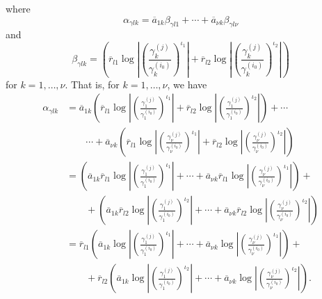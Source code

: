 where
\[\alpha_{\gamma l k} = \overline{a}_{1k}\beta_{\gamma l 1} + \cdots + \overline{a}_{\nu k}\beta_{\gamma l \nu}\]
and
\[\beta_{\gamma l k} = \left(\overline{r}_{l1} \log\left| \left( \frac{\gamma_k^{(j)}}{\gamma_k^{(i_0)}}\right)^{\iota_1}\right|+ \overline{r}_{l2}\log\left| \left( \frac{\gamma_k^{(j)}}{\gamma_k^{(i_0)}}\right)^{\iota_2}\right|\right)\]
for $k = 1, \dots, \nu$.
That is, for $k = 1, \dots, \nu$, we have
\begin{align*}
\alpha_{\gamma l k}	
& = \overline{a}_{1k}\left(\overline{r}_{l1} \log\left| \left( \frac{\gamma_1^{(j)}}{\gamma_1^{(i_0)}}\right)^{\iota_1}\right|+ \overline{r}_{l2}\log\left| \left( \frac{\gamma_1^{(j)}}{\gamma_1^{(i_0)}}\right)^{\iota_2}\right|\right) + \cdots \\ 
	& \quad \quad  \cdots + \overline{a}_{\nu k}\left(\overline{r}_{l1} \log\left| \left( \frac{\gamma_{\nu}^{(j)}}{\gamma_{\nu}^{(i_0)}}\right)^{\iota_1}\right|+ \overline{r}_{l2}\log\left| \left( \frac{\gamma_{\nu}^{(j)}}{\gamma_{\nu}^{(i_0)}}\right)^{\iota_2}\right|\right) \\
& = \left(\overline{a}_{1k}\overline{r}_{l1} \log\left| \left( \frac{\gamma_1^{(j)}}{\gamma_1^{(i_0)}}\right)^{\iota_1}\right| + \cdots + \overline{a}_{\nu k}\overline{r}_{l1} \log\left| \left( \frac{\gamma_{\nu}^{(j)}}{\gamma_{\nu}^{(i_0)}}\right)^{\iota_1}\right| \right)+  \\ 
	& \quad \quad + \left(\overline{a}_{1k}\overline{r}_{l2} \log\left| \left( \frac{\gamma_1^{(j)}}{\gamma_1^{(i_0)}}\right)^{\iota_2}\right| + \cdots + \overline{a}_{\nu k}\overline{r}_{l2} \log\left| \left( \frac{\gamma_{\nu}^{(j)}}{\gamma_{\nu}^{(i_0)}}\right)^{\iota_2}\right| \right)\\
& = \overline{r}_{l1} \left(\overline{a}_{1k} \log\left| \left( \frac{\gamma_1^{(j)}}{\gamma_1^{(i_0)}}\right)^{\iota_1}\right| + \cdots + \overline{a}_{\nu k} \log\left| \left( \frac{\gamma_{\nu}^{(j)}}{\gamma_{\nu}^{(i_0)}}\right)^{\iota_1}\right| \right)+  \\ 
	& \quad \quad + \overline{r}_{l2}\left(\overline{a}_{1k} \log\left| \left( \frac{\gamma_1^{(j)}}{\gamma_1^{(i_0)}}\right)^{\iota_2}\right| + \cdots + \overline{a}_{\nu k}\log\left| \left( \frac{\gamma_{\nu}^{(j)}}{\gamma_{\nu}^{(i_0)}}\right)^{\iota_2}\right| \right).
\end{align*}

